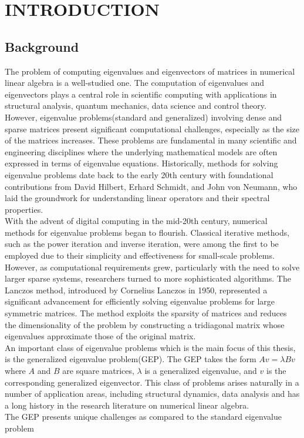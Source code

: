 \chapter{INTRODUCTION}
\newtheorem{theorem}{Theorem}[section]
\newtheorem{definition}{Definition}[section]
\section{Background}
The problem of computing eigenvalues and eigenvectors of matrices in numerical linear algebra is a well-studied one. The computation of eigenvalues and eigenvectors plays a central role in scientific computing with applications in structural analysis, quantum mechanics, data science and control theory. However, eigenvalue problems(standard and generalized)  involving dense and sparse matrices present significant computational challenges, especially as the size of the matrices increases. These problems are fundamental in many scientific and engineering disciplines where the underlying mathematical models are often expressed in terms of eigenvalue equations. Historically, methods for solving eigenvalue problems date back to the early 20th century with foundational contributions from David Hilbert, Erhard Schmidt, and John von Neumann, who laid the groundwork for understanding linear operators and their spectral properties.\\
With the advent of digital computing in the mid-20th century, numerical methods for eigenvalue problems began to flourish. Classical iterative methods, such as the power iteration and inverse iteration, were among the first to be employed due to their simplicity and effectiveness for small-scale problems. However, as computational requirements grew, particularly with the need to solve larger sparse systems, researchers turned to more sophisticated algorithms. The Lanczos method, introduced by Cornelius Lanczos in 1950, represented a significant advancement for efficiently solving eigenvalue problems for large symmetric matrices. The method exploits the sparsity of matrices and reduces the dimensionality of the problem by constructing a tridiagonal matrix whose eigenvalues approximate those of the original matrix.\\
An important class of eigenvalue problems which is the main focus of this thesis, is the generalized eigenvalue problem(GEP). The GEP takes the form $Av=\lambda Bv$ where $A$ and $B$ are square matrices, $\lambda$ is a generalized eigenvalue, and $v$ is the corresponding generalized eigenvector. This class of problems arises naturally in a number of application areas, including structural dynamics, data analysis and has a long history in the research literature on numerical linear algebra.\\
The GEP presents unique challenges as compared to the standard eigenvalue problem
